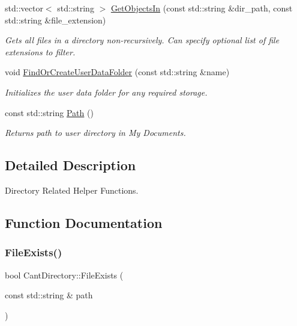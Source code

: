 \begin{DoxyCompactItemize}
std\+::vector$<$ std\+::string $>$ \hyperlink{namespaceCantDirectory_a6b53cda775608f26f9798c40b81f13ef}{Get\+Objects\+In} (const std\+::string \&dir\+\_\+path, const std\+::string \&file\+\_\+extension)
\begin{DoxyCompactList}\small\item\em Gets all files in a directory non-\/recursively. Can specify optional list of file extensions to filter. \end{DoxyCompactList}\item 
void \hyperlink{namespaceCantDirectory_ab1cf2a41c7f33a747d65f2c200724e61}{Find\+Or\+Create\+User\+Data\+Folder} (const std\+::string \&name)
\begin{DoxyCompactList}\small\item\em Initializes the user data folder for any required storage. \end{DoxyCompactList}\item 
const std\+::string \hyperlink{namespaceCantDirectory_aada0c40e37a1b59290f3558e3afb4af0}{Path} ()
\begin{DoxyCompactList}\small\item\em Returns path to user directory in My Documents. \end{DoxyCompactList}\end{DoxyCompactItemize}


\subsection{Detailed Description}
Directory Related Helper Functions. 

\subsection{Function Documentation}
\mbox{\label{namespaceCantDirectory_a767d0a23dd8fbbd289bf99fa9b2e6b2c}} 
\subsubsection{\texorpdfstring{File\+Exists()}{FileExists()}}
{\footnotesize\ttfamily bool Cant\+Directory\+::\+File\+Exists (\begin{DoxyParamCaption}\item[{const std\+::string \&}]{path }\end{DoxyParamCaption})}



